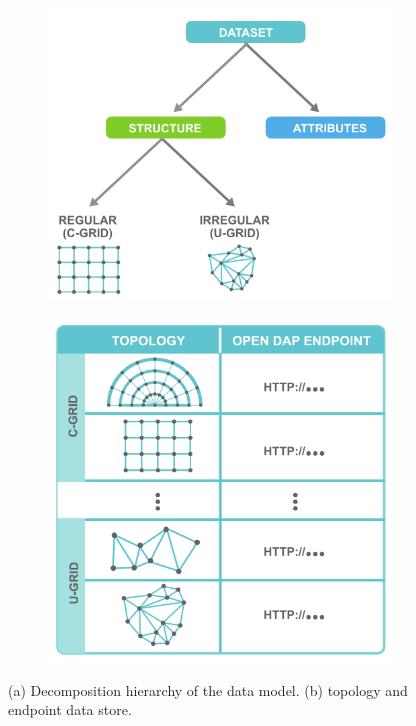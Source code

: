 \begin{figure}[ht!]
  \centering
  \begin{subfigure}[t]{0.45\columnwidth}
    \centering
    \includegraphics[width=\columnwidth]{../figs/data_model_hierarchy}
    \caption{}
    \label{fig:data_hierarchy}
  \end{subfigure}
  \begin{subfigure}[t]{0.45\columnwidth}
    \centering
    \includegraphics[width=\columnwidth]{../figs/sciwms_book_db_topology_endpoint_chart}
    \caption{}
    \label{fig:sciwms_topology_endpoints}
  \end{subfigure}
  \caption{(a) Decomposition hierarchy of the data model.  (b)
    \Sciwms{} topology and endpoint data store.}
\end{figure}
